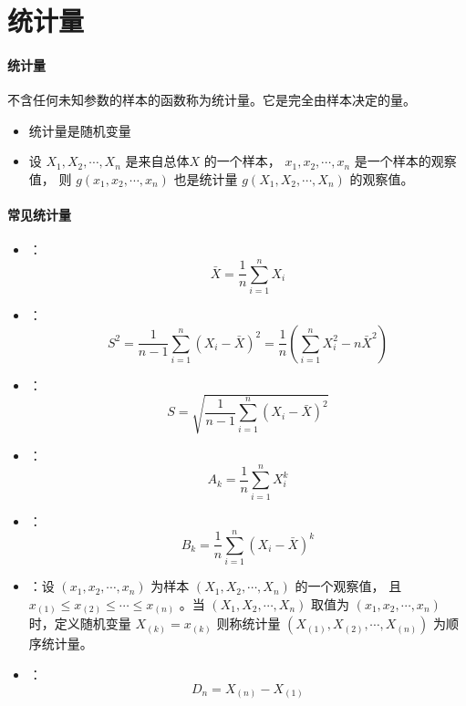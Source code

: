 \section{统计量}

\paragraph{统计量} 不含任何未知参数的样本的函数称为统计量。它是完全由样本决定的量。
\begin{itemize}[leftmargin=\paritemindent]
    \item 统计量是随机变量
    \item 设 $ X_1, X_2, \cdots, X_n $ 是来自总体$ X $ 的一个样本， $ x_1, x_2, \cdots, x_n $ 是一个样本的观察值，
    则 $ g(x_1, x_2, \cdots, x_n) $ 也是统计量 $ g(X_1, X_2, \cdots, X_n) $ 的观察值。
\end{itemize}

\paragraph{常见统计量}
\begin{itemize}[leftmargin=\paritemindent]
    \item {}：
    $$ \bar{X} = \frac{1}{n} \sum_{i=1}^{n} X_i $$
    \item {}：
    $$ S^2 = \frac{1}{n-1} \sum_{i=1}^{n} (X_i - \bar{X})^2 = \frac{1}{n} \left( \sum_{i=1}^{n} X_i^2 - n\bar{X}^2 \right) $$
    \item {}：
    $$ S = \sqrt{\frac{1}{n-1} \sum_{i=1}^{n} (X_i - \bar{X})^2} $$
    \item {}：
    $$ A_k = \frac{1}{n} \sum_{i=1}^{n} X_i^k $$
    \item {}：
    $$ B_k = \frac{1}{n} \sum_{i=1}^{n} (X_i - \bar{X})^k $$
    \item {}：设 $ (x_1, x_2, \cdots, x_n) $ 为样本 $ (X_1, X_2, \cdots, X_n) $ 的一个观察值，
    且 $ x_{(1)} \leqslant x_{(2)} \leqslant \cdots \leqslant x_{(n)} $ 。当 $ (X_1, X_2, \cdots, X_n) $ 取值为
    $ (x_1, x_2, \cdots, x_n) $ 时，定义随机变量 $ X_{(k)} = x_{(k)} $ 则称统计量 $ (X_{(1)}, X_{(2)}, \cdots, X_{(n)}) $
    为顺序统计量。
    \item {}：
    $$ D_n = X_{(n)} - X_{(1)} $$
\end{itemize}

